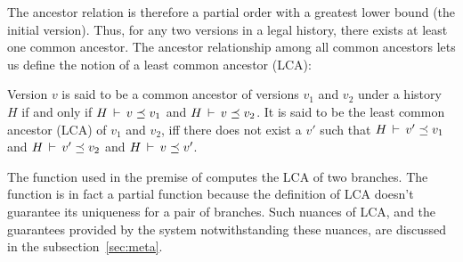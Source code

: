 The ancestor relation is therefore a partial order with a greatest
lower bound (the initial version).  Thus, for any two versions in a
legal history, there exists at least one common ancestor.  The ancestor
relationship among all common ancestors lets us define the notion of a
least common ancestor (LCA):

\begin{definition} 
Version $v$ is said to be a common ancestor of versions $v_1$ and
$v_2$ under a history $H$ if and only if $H\,\vdash\,v \preceq v_1$
and $H\,\vdash\,v \preceq v_2$. It is said to be the least common
ancestor (LCA) of $v_1$ and $v_2$, iff there does not exist a $v'$
such that $H\,\vdash\,v' \preceq v_1$ and $H\,\vdash\,v' \preceq v_2$
and $H\,\vdash\,v \preceq v'$.
\end{definition}

The function  used in the premise of 
computes the LCA of two branches. The function is in fact a partial
function because the definition of LCA doesn't guarantee its
uniqueness for a pair of branches. Such nuances of LCA, and the
guarantees provided by the system notwithstanding these nuances, are
discussed in the subsection~\ref{sec:meta}. 




